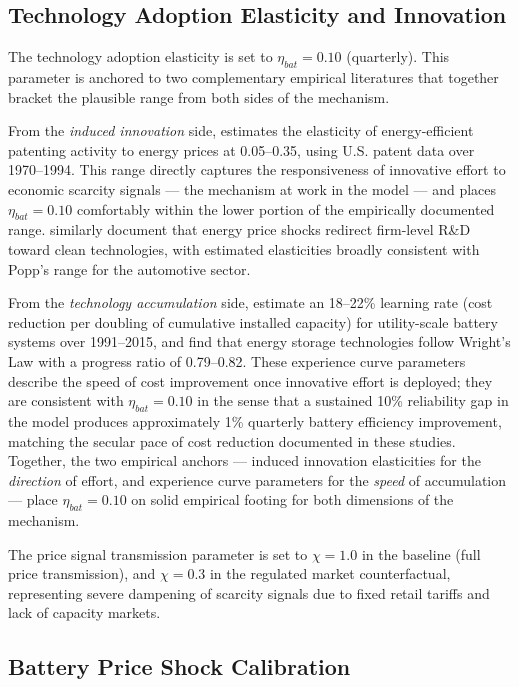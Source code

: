 \documentclass[12pt, a4paper]{article}
\begin{document}
\subsection{Technology Adoption Elasticity and Innovation}

The technology adoption elasticity is set to $\eta_{bat} = 0.10$ (quarterly). This parameter is anchored to two complementary empirical literatures that together bracket the plausible range from both sides of the mechanism.

From the \textit{induced innovation} side, \citet{popp2002} estimates the elasticity of energy-efficient patenting activity to energy prices at 0.05--0.35, using U.S. patent data over 1970--1994. This range directly captures the responsiveness of innovative effort to economic scarcity signals --- the mechanism at work in the model --- and places $\eta_{bat} = 0.10$ comfortably within the lower portion of the empirically documented range. \citet{aghion2016} similarly document that energy price shocks redirect firm-level R\&D toward clean technologies, with estimated elasticities broadly consistent with Popp's range for the automotive sector.

From the \textit{technology accumulation} side, \citet{kittner2017} estimate an 18--22\% learning rate (cost reduction per doubling of cumulative installed capacity) for utility-scale battery systems over 1991--2015, and \citet{way2022} find that energy storage technologies follow Wright's Law with a progress ratio of 0.79--0.82. These experience curve parameters describe the speed of cost improvement once innovative effort is deployed; they are consistent with $\eta_{bat} = 0.10$ in the sense that a sustained 10\% reliability gap in the model produces approximately 1\% quarterly battery efficiency improvement, matching the secular pace of cost reduction documented in these studies. Together, the two empirical anchors --- induced innovation elasticities for the \textit{direction} of effort, and experience curve parameters for the \textit{speed} of accumulation --- place $\eta_{bat} = 0.10$ on solid empirical footing for both dimensions of the mechanism.

The price signal transmission parameter is set to $\chi = 1.0$ in the baseline (full price transmission), and $\chi = 0.3$ in the regulated market counterfactual, representing severe dampening of scarcity signals due to fixed retail tariffs and lack of capacity markets.

\subsection{Battery Price Shock Calibration}
\end{document}
